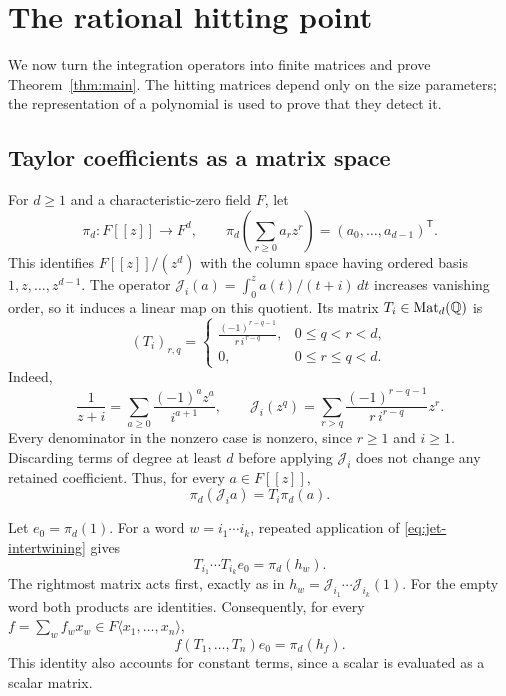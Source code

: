 \section{The rational hitting point}
\label{sec:construction}

We now turn the integration operators into finite matrices and prove
Theorem~\ref{thm:main}. The hitting matrices depend only on the size parameters;
the representation of a polynomial is used to prove that they detect it.

\subsection{Taylor coefficients as a matrix space}

For $d\ge1$ and a characteristic-zero field $F$, let
\[
 \pi_d:F[[z]]\longrightarrow F^d,
 \qquad
 \pi_d\left(\sum_{r\ge0}a_rz^r\right)=(a_0,\ldots,a_{d-1})^{\mathsf T}.
\]
This identifies $F[[z]]/(z^d)$ with the column space having ordered basis
$1,z,\ldots,z^{d-1}$. The operator
$\mathcal J_i(a)=\int_0^z a(t)/(t+i)\,dt$ increases vanishing order, so it
induces a linear map on this quotient. Its matrix $T_i\in\operatorname{Mat}_d(\mathbb{Q})$ is
\begin{equation}\label{eq:explicit-matrices}
 (T_i)_{r,q}=
 \begin{cases}
 \displaystyle\frac{(-1)^{r-q-1}}{r\,i^{\,r-q}},&0\le q<r<d,\\[4pt]
 0,&0\le r\le q<d.
 \end{cases}
\end{equation}
Indeed,
\[
 \frac1{z+i}=\sum_{a\ge0}\frac{(-1)^az^a}{i^{a+1}},
 \qquad
 \mathcal J_i(z^q)
 =\sum_{r>q}\frac{(-1)^{r-q-1}}{r\,i^{r-q}}z^r.
\]
Every denominator in the nonzero case is nonzero, since $r\ge1$ and $i\ge1$.
Discarding terms of degree at least $d$ before applying $\mathcal J_i$
does not change any retained coefficient. Thus, for every $a\in F[[z]]$,
\begin{equation}\label{eq:jet-intertwining}
 \pi_d(\mathcal J_i a)=T_i\pi_d(a).
\end{equation}

Let $e_0=\pi_d(1)$. For a word $w=i_1\cdots i_k$, repeated application of
\eqref{eq:jet-intertwining} gives
\[
 T_{i_1}\cdots T_{i_k}e_0=\pi_d(h_w).
\]
The rightmost matrix acts first, exactly as in
$h_w=\mathcal J_{i_1}\cdots\mathcal J_{i_k}(1)$.
For the empty word both products are identities. Consequently, for every
$f=\sum_w f_wx_w\in F\langle x_1,\ldots,x_n\rangle$,
\begin{equation}\label{eq:first-column}
 f(T_1,\ldots,T_n)e_0=\pi_d(h_f).
\end{equation}
This identity also accounts for constant terms, since a scalar is evaluated
as a scalar matrix.

